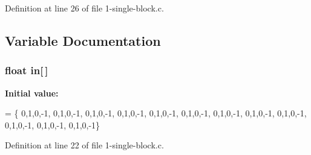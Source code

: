 Definition at line 26 of file 1-\/single-\/block.\+c.



\subsection{Variable Documentation}
\subsubsection[{\texorpdfstring{in}{in}}]{ float in\mbox{[}$\,$\mbox{]}}\hypertarget{1-single-block_8c_a18b1d64a94008e3c56953d279b8095e2}{}\label{1-single-block_8c_a18b1d64a94008e3c56953d279b8095e2}
{\bfseries Initial value\+:}
\begin{DoxyCode}
= \{  
  0,1,0,-1, 0,1,0,-1, 0,1,0,-1, 0,1,0,-1, 0,1,0,-1, 0,1,0,-1,
  0,1,0,-1, 0,1,0,-1, 0,1,0,-1, 0,1,0,-1, 0,1,0,-1, 0,1,0,-1\}
\end{DoxyCode}


Definition at line 22 of file 1-\/single-\/block.\+c.

